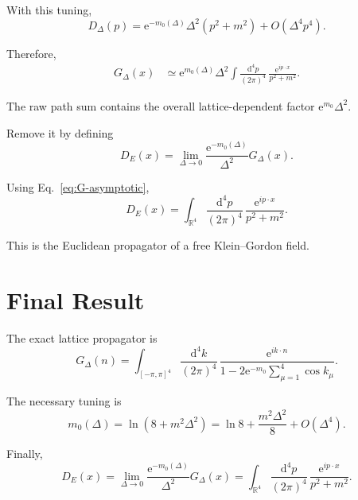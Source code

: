 \documentclass[11pt,a4paper,oneside]{article}
\newcommand{\ee}{\mathrm{e}}
\newcommand{\dd}{\mathrm{d}}
\begin{document}
	With this tuning,
	\begin{equation}
		D_\Delta(p)
		=
		\ee^{-m_0(\Delta)}
		\Delta^2(p^2+m^2)
		+
		O(\Delta^4p^4).
	\end{equation}
	
	Therefore,
	\begin{align}
		G_\Delta(x)
		&\simeq
		\ee^{m_0(\Delta)}\Delta^2
		\int
		\frac{\dd^4p}{(2\pi)^4}
		\,
		\frac{\ee^{ip\cdot x}}{p^2+m^2}.
		\label{eq:G-asymptotic}
	\end{align}
	
	The raw path sum contains the overall lattice-dependent factor
	$\ee^{m_0}\Delta^2$.
	
	Remove it by defining
	\begin{equation}
		\boxed{
			D_E(x)
			=
			\lim_{\Delta\to0}
			\frac{\ee^{-m_0(\Delta)}}{\Delta^2}
			G_\Delta(x).
		}
		\label{eq:normalization}
	\end{equation}
	
	Using Eq.~\eqref{eq:G-asymptotic},
	\begin{equation}
		\boxed{
			D_E(x)
			=
			\int_{\mathbb{R}^4}
			\frac{\dd^4p}{(2\pi)^4}
			\,
			\frac{\ee^{ip\cdot x}}{p^2+m^2}.
		}
		\label{eq:KG-propagator}
	\end{equation}
	
	This is the Euclidean propagator of a free Klein--Gordon field.
	
	
	\section*{Final Result}
	
	The exact lattice propagator is
	\begin{equation}
		\boxed{
			G_\Delta(n)
			=
			\int_{[-\pi,\pi]^4}
			\frac{\dd^4k}{(2\pi)^4}
			\,
			\frac{
				\ee^{ik\cdot n}
			}{
				1
				-
				2\ee^{-m_0}
				\displaystyle\sum_{\mu=1}^{4}\cos k_\mu
			}.
		}
	\end{equation}
	
	The necessary tuning is
	\begin{equation}
		\boxed{
			m_0(\Delta)
			=
			\ln(8+m^2\Delta^2)
			=
			\ln8
			+
			\frac{m^2\Delta^2}{8}
			+
			O(\Delta^4).
		}
	\end{equation}
	
	Finally,
	\begin{equation}
		\boxed{
			D_E(x)
			=
			\lim_{\Delta\to0}
			\frac{\ee^{-m_0(\Delta)}}{\Delta^2}
			G_\Delta(x)
			=
			\int_{\mathbb{R}^4}
			\frac{\dd^4p}{(2\pi)^4}
			\,
			\frac{\ee^{ip\cdot x}}{p^2+m^2}.
		}
	\end{equation}
\end{document}
